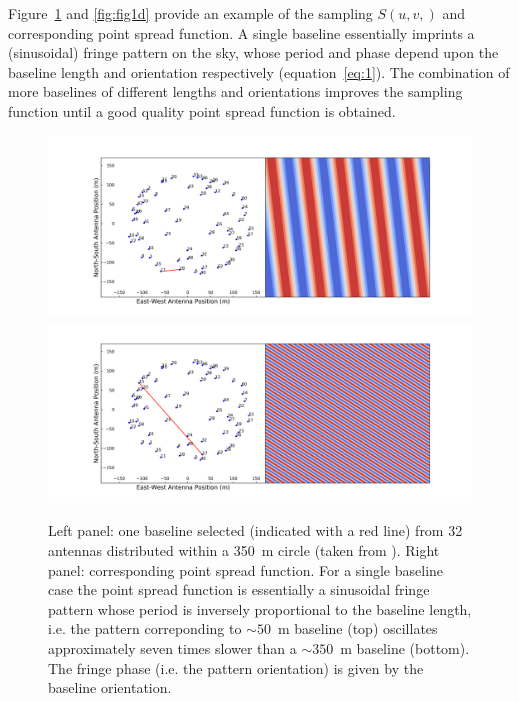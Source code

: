 Figure~\ref{fig:fig1c} and \ref{fig:fig1d} provide an example of the sampling $S(u,v,)$ and corresponding point spread function. A single baseline essentially imprints a (sinusoidal) fringe pattern on the sky, whose period and phase depend upon the baseline length and orientation respectively (equation~\ref{eq:1}). The combination of more baselines of different lengths and orientations improves the sampling function until a good quality point spread function is obtained.
%
\begin{figure}[]
\begin{center}
\includegraphics[width=1.\textwidth]{Bernardi/fringe_bl_11_18}
\includegraphics[width=1.\textwidth]{Bernardi/fringe_bl_17_15}
\end{center}
\caption{Left panel: one baseline selected (indicated with a red line) from 32 antennas distributed within a 350~m circle (taken from \cite{jacobs11}). Right panel: corresponding point spread function. For a single baseline case the point spread function is essentially a sinusoidal fringe pattern whose period is inversely proportional to the baseline length, i.e. the pattern correponding to $\sim 50$~m baseline (top) oscillates approximately seven times slower than a $\sim 350$~m baseline (bottom). The fringe phase (i.e. the pattern orientation) is given by the baseline orientation.}
\label{fig:fig1c}
\end{figure}
%
